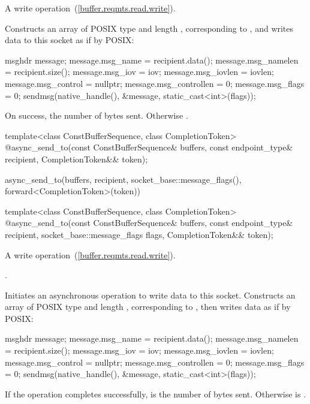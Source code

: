 \begin{itemdescr}
\pnum
A write operation~(\ref{buffer.reqmts.read.write}).

\pnum
\effects Constructs an array  of POSIX type  and length , corresponding to , and writes data to this socket as if by POSIX:
\begin{codeblock}
msghdr message;
message.msg_name = recipient.data();
message.msg_namelen = recipient.size();
message.msg_iov = iov;
message.msg_iovlen = iovlen;
message.msg_control = nullptr;
message.msg_controllen = 0;
message.msg_flags = 0;
sendmsg(native_handle(), &message, static_cast<int>(flags));
\end{codeblock}


\pnum
\returns On success, the number of bytes sent. Otherwise .
\end{itemdescr}

\begin{itemdecl}
template<class ConstBufferSequence, class CompletionToken>
  @\DEDUCED@ async_send_to(const ConstBufferSequence& buffers,
                        const endpoint_type& recipient,
                        CompletionToken&& token);
\end{itemdecl}

\begin{itemdescr}
\pnum
\returns
\begin{codeblock}
async_send_to(buffers, recipient, socket_base::message_flags(),
              forward<CompletionToken>(token))
\end{codeblock}
\end{itemdescr}

\begin{itemdecl}
template<class ConstBufferSequence, class CompletionToken>
  @\DEDUCED@ async_send_to(const ConstBufferSequence& buffers,
                        const endpoint_type& recipient,
                        socket_base::message_flags flags,
                        CompletionToken&& token);
\end{itemdecl}

\begin{itemdescr}
\pnum
A write operation~(\ref{buffer.reqmts.read.write}).

\pnum
\completionsig {}.

\pnum
\effects Initiates an asynchronous operation to write data to this socket. Constructs an array  of POSIX type  and length , corresponding to , then writes data as if by POSIX:
\begin{codeblock}
msghdr message;
message.msg_name = recipient.data();
message.msg_namelen = recipient.size();
message.msg_iov = iov;
message.msg_iovlen = iovlen;
message.msg_control = nullptr;
message.msg_controllen = 0;
message.msg_flags = 0;
sendmsg(native_handle(), &message, static_cast<int>(flags));
\end{codeblock}


\pnum
If the operation completes successfully,  is the number of bytes sent. Otherwise  is .
\end{itemdescr}




